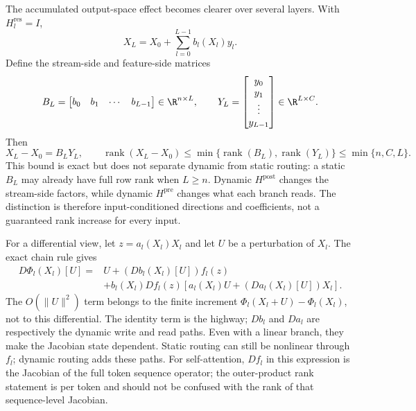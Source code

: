 \documentclass{article}
\newcommand{\Hpre}{H^{\mathrm{pre}}}
\newcommand{\Hpost}{H^{\mathrm{post}}}
\newcommand{\Hres}{H^{\mathrm{res}}}
\begin{document}
The accumulated output-space effect becomes clearer over several layers. With $\Hres_l=I$,
\begin{equation}
 X_L=X_0+\sum_{l=0}^{L-1}b_l(X_l)y_l.
 \label{eq:dynamic-sum}
\end{equation}
Define the stream-side and feature-side matrices
\begin{equation}
 B_L=\begin{bmatrix}b_0&b_1&\cdots&b_{L-1}\end{bmatrix}\in\R^{n\times L},\qquad
 Y_L=\begin{bmatrix}y_0\\y_1\\\vdots\\y_{L-1}\end{bmatrix}\in\R^{L\times C}.
 \label{eq:dynamic-by}
\end{equation}
Then
\begin{equation}
 X_L-X_0=B_LY_L,\qquad
 \operatorname{rank}(X_L-X_0)
 \leq\min\{\operatorname{rank}(B_L),\operatorname{rank}(Y_L)\}
 \leq\min\{n,C,L\}.
 \label{eq:dynamic-output-rank}
\end{equation}
This bound is exact but does not separate dynamic from static routing: a static $B_L$ may already have full row rank when $L\geq n$. Dynamic $\Hpost$ changes the stream-side factors, while dynamic $\Hpre$ changes what each branch reads. The distinction is therefore input-conditioned directions and coefficients, not a guaranteed rank increase for every input.

For a differential view, let $z=a_l(X_l)X_l$ and let $U$ be a perturbation of $X_l$. The exact chain rule gives
\begin{align}
 D\Phi_l(X_l)[U]
 ={}&U+(Db_l(X_l)[U])f_l(z) \\[-2pt]
 &+b_l(X_l)Df_l(z)\!\left[a_l(X_l)U+(Da_l(X_l)[U])X_l\right].
 \label{eq:dynamic-jacobian}
\end{align}
The $O(\|U\|^2)$ term belongs to the finite increment $\Phi_l(X_l+U)-\Phi_l(X_l)$, not to this differential. The identity term is the highway; $Db_l$ and $Da_l$ are respectively the dynamic write and read paths. Even with a linear branch, they make the Jacobian state dependent. Static routing can still be nonlinear through $f_l$; dynamic routing adds these paths.
For self-attention, $Df_l$ in this expression is the Jacobian of the full token sequence operator; the outer-product rank statement is per token and should not be confused with the rank of that sequence-level Jacobian.
\end{document}
